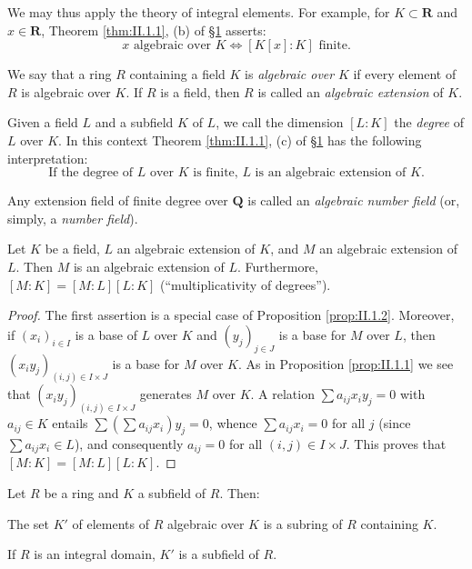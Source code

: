We may thus apply the theory of integral elements. For example, for
$K\subset\mathbf{R}$ and $x\in\mathbf{R}$, Theorem \ref{thm:II.1.1}, (b) of
\hyperref[sec:2.1]{§1} asserts:
\begin{equation}
x\text{ algebraic over }K\Leftrightarrow[K[x]:K]\text{ finite.}
\label{eq:II.3.2}
\end{equation}

We say that a ring $R$ containing a field $K$ is \emph{algebraic over} $K$ if
every element of $R$ is algebraic over $K$. If $R$ is a field, then $R$ is
called an \emph{algebraic extension} of $K$.

Given a field $L$ and a subfield $K$ of $L$, we call the dimension $[L:K]$
the \emph{degree} of $L$ over $K$. In this context Theorem \ref{thm:II.1.1},
(c) of \hyperref[sec:2.1]{§1} has the following interpretation:
\begin{equation}
\text{If the degree of }L\text{ over }K\text{ is finite, }L\text{ is an
algebraic extension of }K.
\label{eq:II.3.3}
\end{equation}

Any extension field of finite degree over $\mathbf{Q}$ is called an
\emph{algebraic number field} (or, simply, a \emph{number field}).

\begin{proposition}
\label{prop:II.3.1}
Let $K$ be a field, $L$ an algebraic extension of $K$, and $M$ an algebraic
extension of $L$. Then $M$ is an algebraic extension of $L$. Furthermore,
$[M:K]=[M:L][L:K]$ (``multiplicativity of degrees'').
\end{proposition}

\begin{proof}
The first assertion is a special case of Proposition \ref{prop:II.1.2}.
Moreover, if $(x_{i})_{i\in I}$ is a base of $L$ over $K$ and
$(y_{j})_{j\in J}$ is a base for $M$ over $L$, then
$(x_{i}y_{j})_{(i,j)\in I\times J}$ is a base for $M$ over $K$. As in
Proposition \ref{prop:II.1.1} we see that
$(x_{i}y_{j})_{(i,j)\in I\times J}$ generates $M$ over $K$. A relation
$\sum a_{ij}x_{i}y_{j}=0$ with $a_{ij}\in K$ entails
$\sum(\sum a_{ij}x_{i})y_{j}=0$, whence $\sum a_{ij}x_{i}=0$ for all $j$
(since $\sum a_{ij}x_{i}\in L$), and consequently $a_{ij}=0$ for all
$(i,j)\in I\times J$. This proves that $[M:K]=[M:L][L:K]$.
\end{proof}

\begin{proposition}
\label{prop:II.3.2}
Let $R$ be a ring and $K$ a subfield of $R$. Then:
\begin{alist}
\item The set $K'$ of elements of $R$ algebraic over $K$ is a subring of $R$
containing $K$.
\item If $R$ is an integral domain, $K'$ is a subfield of $R$.
\end{alist}
\end{proposition}


